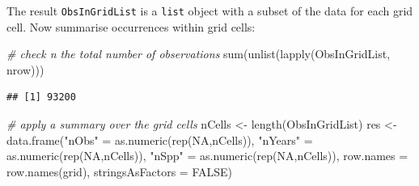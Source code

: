 \documentclass[
  10pt,
]{article}
\newenvironment{Shaded}{\begin{snugshade}}{\end{snugshade}}
\newcommand{\AttributeTok}[1]{\textcolor[rgb]{0.77,0.63,0.00}{#1}}
\newcommand{\CommentTok}[1]{\textcolor[rgb]{0.56,0.35,0.01}{\textit{#1}}}
\newcommand{\ConstantTok}[1]{\textcolor[rgb]{0.00,0.00,0.00}{#1}}
\newcommand{\FunctionTok}[1]{\textcolor[rgb]{0.00,0.00,0.00}{#1}}
\newcommand{\NormalTok}[1]{#1}
\newcommand{\OtherTok}[1]{\textcolor[rgb]{0.56,0.35,0.01}{#1}}
\newcommand{\StringTok}[1]{\textcolor[rgb]{0.31,0.60,0.02}{#1}}
\begin{document}
The result \texttt{ObsInGridList} is a \texttt{list} object with a subset of the data for each grid cell. Now summarise occurrences within grid cells:

\begin{Shaded}
\begin{Highlighting}[]
\CommentTok{\# check n the total number of observations}
\FunctionTok{sum}\NormalTok{(}\FunctionTok{unlist}\NormalTok{(}\FunctionTok{lapply}\NormalTok{(ObsInGridList, nrow)))}
\end{Highlighting}
\end{Shaded}

\begin{verbatim}
## [1] 93200
\end{verbatim}

\begin{Shaded}
\begin{Highlighting}[]
\CommentTok{\# apply a summary over the grid cells }
\NormalTok{nCells }\OtherTok{\textless{}{-}} \FunctionTok{length}\NormalTok{(ObsInGridList)}
\NormalTok{res }\OtherTok{\textless{}{-}} \FunctionTok{data.frame}\NormalTok{(}\StringTok{"nObs"} \OtherTok{=} \FunctionTok{as.numeric}\NormalTok{(}\FunctionTok{rep}\NormalTok{(}\ConstantTok{NA}\NormalTok{,nCells)),}
                  \StringTok{"nYears"} \OtherTok{=} \FunctionTok{as.numeric}\NormalTok{(}\FunctionTok{rep}\NormalTok{(}\ConstantTok{NA}\NormalTok{,nCells)),}
                  \StringTok{"nSpp"} \OtherTok{=} \FunctionTok{as.numeric}\NormalTok{(}\FunctionTok{rep}\NormalTok{(}\ConstantTok{NA}\NormalTok{,nCells)),}
                  \AttributeTok{row.names =} \FunctionTok{row.names}\NormalTok{(grid),}
                  \AttributeTok{stringsAsFactors =} \ConstantTok{FALSE}\NormalTok{)}


\end{Highlighting}
\end{Shaded}
\end{document}
